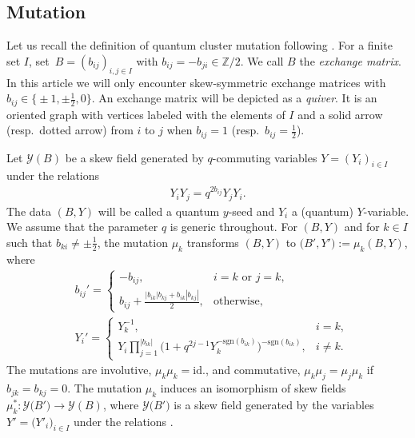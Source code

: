 \documentclass[pdftex]{sigma}
\newcommand{\Z}{{\mathbb Z}}
\newcommand\bY{Y}
\numberwithin{equation}{section}
\begin{document}
\subsection{Mutation}\label{ss:mutation}

Let us recall the definition of quantum cluster mutation following \cite{FG06}.
For a finite set $I$, set~${B = (b_{ij})_{i,j \in I}}$ with
$b_{ij} = -b_{ji} \in \Z/2$. We call $B$ the {\it exchange matrix}.
In this article we will only encounter skew-symmetric exchange matrices
with $b_{ij} \in \bigl\{\pm 1, \pm \frac{1}{2},0\bigr\}$. An exchange matrix
will be depicted as a {\em quiver}. It is an oriented graph
with vertices labeled with the elements of $I$ and a solid arrow
(resp.\ dotted arrow) from $i$ to $j$ when $b_{ij}=1$ \big(resp.\
$b_{ij}=\frac{1}{2}$\big).

Let $\mathcal{Y}(B)$ be a skew field generated by $q$-commuting variables
$\bY = (Y_i)_{i \in I}$ under the relations
\begin{align}\label{yyq}
 Y_i Y_j = q^{2b_{ij}} Y_j Y_i.
\end{align}
The data $(B, \bY)$ will be called a quantum $y$-seed and $Y_i$ a (quantum) $Y$-variable.
We assume that the parameter $q$ is generic throughout.
%
For $(B, \bY)$ and for $k \in I$ such that
$b_{ki} \neq \pm \frac{1}{2}$, the mutation $\mu_k$ transforms
$(B, \bY)$ to $\bigl(B', \bY'\bigr) := \mu_k (B,\bY)$, where
\begin{align}\label{muB}
 &b_{ij}' =
 \begin{cases}
 -b_{ij}, & i=k \text{ or } j=k,
 \\
 \displaystyle{b_{ij} + \frac{|b_{ik}| b_{kj} + b_{ik} |b_{kj}|}{2}},
 & \text{otherwise},
 \end{cases}
 \\ \label{muY}
%
 &Y_{i}' =
 \begin{cases}
 Y_k^{-1}, & i=k,
 \\
 \displaystyle{Y_i \prod_{j=1}^{|b_{ik}|}\bigl(1 + q^{2j-1} Y_k^{-\mathrm{sgn}(b_{ik})}\bigr)^{-\mathrm{sgn}(b_{ik})}}, & i \neq k.
 \end{cases}
\end{align}
The mutations are involutive, $\mu_k \mu_k = \mathrm{id.}$, and
commutative, $\mu_k \mu_j = \mu_j \mu_k$ if $b_{jk}=b_{kj}=0$. The
mutation $\mu_k$ induces an isomorphism of skew fields
$\mu_k^{\ast}\colon \mathcal{Y}\bigl(B'\bigr) \to \mathcal{Y}(B)$, where
$\mathcal{Y}\bigl(B'\bigr)$ is a skew field generated by the variables
$Y'=\bigl(Y'_i\bigr)_{i\in I}$ under the relations
.
\end{document}
